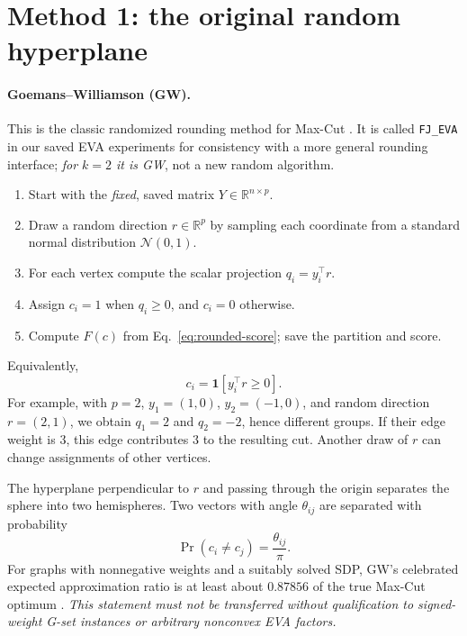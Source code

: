 \documentclass[10pt,letterpaper]{article}
\newcommand{\R}{\mathbb{R}}
\newcommand{\I}{\mathbf 1}
\begin{document}
\section{Method 1: the original random hyperplane}
\label{sec:gw}
\paragraph{Goemans--Williamson (GW).} This is the classic randomized rounding method for Max-Cut \cite{goemans1995}. It is called \texttt{FJ\_EVA} in our saved EVA experiments for consistency with a more general rounding interface; \emph{for $k=2$ it is GW}, not a new random algorithm.

\begin{enumerate}
\item Start with the \emph{fixed}, saved matrix $Y\in\R^{n\times p}$.
\item Draw a random direction $r\in\R^p$ by sampling each coordinate from a standard normal distribution $\mathcal N(0,1)$.
\item For each vertex compute the scalar projection $q_i=y_i^\top r$.
\item Assign $c_i=1$ when $q_i\ge0$, and $c_i=0$ otherwise.
\item Compute $F(c)$ from Eq.~\eqref{eq:rounded-score}; save the partition and score.
\end{enumerate}
Equivalently,
\begin{equation}\label{eq:gw}
 c_i=\I[y_i^\top r\ge0].
\end{equation}
For example, with $p=2$, $y_1=(1,0)$, $y_2=(-1,0)$, and random direction $r=(2,1)$, we obtain $q_1=2$ and $q_2=-2$, hence different groups. If their edge weight is $3$, this edge contributes $3$ to the resulting cut. Another draw of $r$ can change assignments of other vertices.

The hyperplane perpendicular to $r$ and passing through the origin separates the sphere into two hemispheres. Two vectors with angle $\theta_{ij}$ are separated with probability
\begin{equation}\label{eq:gwprob}
 \Pr(c_i\ne c_j)=\frac{\theta_{ij}}{\pi}.
\end{equation}
For graphs with nonnegative weights and a suitably solved SDP, GW's celebrated expected approximation ratio is at least about $0.87856$ of the true Max-Cut optimum \cite{goemans1995}. \emph{This statement must not be transferred without qualification to signed-weight G-set instances or arbitrary nonconvex EVA factors.}
\end{document}
